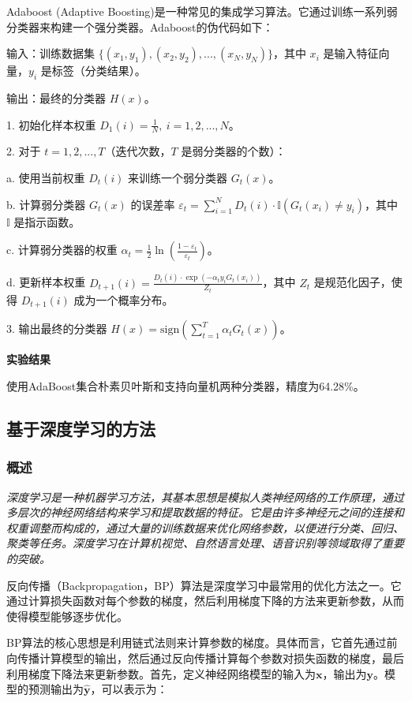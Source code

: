 \documentclass[hyperref,a4paper,UTF8]{ctexart}
\begin{document}
Adaboost (Adaptive Boosting)是一种常见的集成学习算法。它通过训练一系列弱分类器来构建一个强分类器。Adaboost的伪代码如下：

输入：训练数据集 $\{(x_1,y_1), (x_2,y_2), ..., (x_N,y_N)\}$，其中 $x_i$ 是输入特征向量，$y_i$ 是标签（分类结果）。

输出：最终的分类器 $H(x)$。

1. 初始化样本权重 $D_1(i) = \frac{1}{N}, \ i = 1,2,...,N$。

2. 对于 $t = 1,2,...,T$（迭代次数，$T$ 是弱分类器的个数）：

    a. 使用当前权重 $D_t(i)$ 来训练一个弱分类器 $G_t(x)$。
    
    b. 计算弱分类器 $G_t(x)$ 的误差率 $\varepsilon_t = \sum_{i=1}^{N} D_t(i) \cdot \mathbb{I}(G_t(x_i) \neq y_i)$，其中 $\mathbb{I}$ 是指示函数。
    
    c. 计算弱分类器的权重 $\alpha_t = \frac{1}{2} \ln \left( \frac{1-\varepsilon_t}{\varepsilon_t} \right)$。
    
    d. 更新样本权重 $D_{t+1}(i) = \frac{D_t(i) \cdot \exp(-\alpha_t y_i G_t(x_i))}{Z_t}$，其中 $Z_t$ 是规范化因子，使得 $D_{t+1}(i)$ 成为一个概率分布。
    
3. 输出最终的分类器 $H(x) = \text{sign} \left( \sum_{t=1}^{T} \alpha_t G_t(x) \right)$。

\textbf{实验结果}


使用AdaBoost集合朴素贝叶斯和支持向量机两种分类器，精度为64.28\%。

\subsection{基于深度学习的方法}

\subsubsection{概述}
\textit{深度学习是一种机器学习方法，其基本思想是模拟人类神经网络的工作原理，通过多层次的神经网络结构来学习和提取数据的特征。它是由许多神经元之间的连接和权重调整而构成的，通过大量的训练数据来优化网络参数，以便进行分类、回归、聚类等任务。深度学习在计算机视觉、自然语言处理、语音识别等领域取得了重要的突破。}\cite{DBLP:journals/corr/abs-1801-07883}


反向传播（Backpropagation，BP）算法是深度学习中最常用的优化方法之一。它通过计算损失函数对每个参数的梯度，然后利用梯度下降的方法来更新参数，从而使得模型能够逐步优化。

BP算法的核心思想是利用链式法则来计算参数的梯度。具体而言，它首先通过前向传播计算模型的输出，然后通过反向传播计算每个参数对损失函数的梯度，最后利用梯度下降法来更新参数。首先，定义神经网络模型的输入为$\mathbf{x}$，输出为$\mathbf{y}$。模型的预测输出为$\hat{\mathbf{y}}$，可以表示为：
\end{document}

